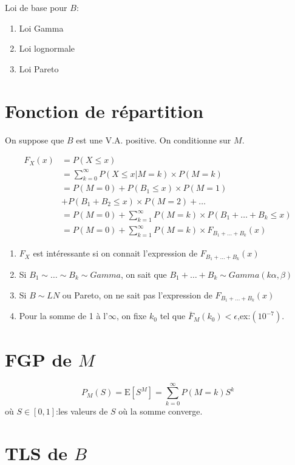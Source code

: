 \documentclass[]{book}
\theoremstyle{definition}
\theoremstyle{definition}
\theoremstyle{definition}
\theoremstyle{remark}
\begin{document}
Loi de base pour \(B\):

\begin{enumerate}
\item Loi Gamma
\item Loi lognormale
\item Loi Pareto
\end{enumerate}

\section{Fonction de répartition}\label{fonction-de-repartition}

On suppose que \(B\) est une V.A. positive. On conditionne sur \(M\).

\begin{align*}
F_X(x)& = P(X\leq x)\\
& = \sum^\infty_{k=0} P(X \leq x|M=k) \times P(M=k)\\
& =P(M=0) + P(B_1 \leq x) \times P(M=1)\\
& +P(B_1+B_2 \leq x) \times P(M=2)+ \dots\\
& =P(M=0) + \sum^\infty_{k=1} P(M=k) \times P(B_1+ \dots + B_k \leq x)\\
& =P(M=0) + \sum^\infty_{k=1} P(M=k) \times F_{B_1+ \dots +B_k} (x)   
\end{align*}

\begin{enumerate}
\item ${F}_X$ est intéressante si on connait l'expression de $F_{B_1+ \dots +B_k} (x)$
\item Si $B_1 \sim \dots \sim B_k \sim Gamma$, on sait que $B_1+ \dots +B_k \sim Gamma(k\alpha,\beta)$
\item Si $B \sim LN$ ou Pareto, on ne sait pas l'expression de $F_{B_1+ \dots +B_k} (x)$
\item Pour la somme de 1 à l'$\infty$, on fixe $k_0$ tel que $\bar{F}_M(k_0)<\epsilon$,ex:$(10^{-7})$.
\end{enumerate}

\section{\texorpdfstring{FGP de \(M\)}{FGP de M}}\label{fgp-de-m}

\[
P_M(S)=\text{E}[S^M]=\sum^\infty_{k=0} P(M=k)S^k 
\] où \(S\in [0,1]\):les valeurs de \(S\) où la somme converge.

\section{\texorpdfstring{TLS de \(B\)}{TLS de B}}\label{tls-de-b}
\end{document}
